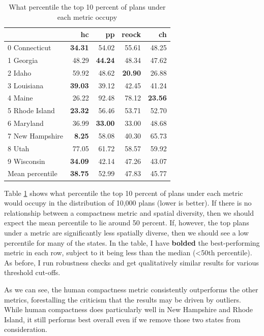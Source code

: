 \documentclass[]{article}
\begin{document}
\begin{table}[h!]
\begin{center}
\caption{What percentile the top 10 percent of plans under each metric occupy}
\label{table:top_plans_sd_percentile}
\begin{tabular}{lrrrr}
\toprule
{} &     hc &     pp &  reock &     ch \\
\midrule
0 Connecticut &  \textbf{34.31} &  54.02 &  55.61 &  48.25 \\
1 Georgia &  48.29 &  \textbf{44.24} &  48.34 &  47.62 \\
2 Idaho &  59.92 &  48.62 &  \textbf{20.90} &  26.88 \\
3 Louisiana &  \textbf{39.03} &  39.12 &  42.45 &  41.24 \\
4 Maine &  26.22 &  92.48 &  78.12 &  \textbf{23.56} \\
5 Rhode Island &  \textbf{23.32} &  56.46 &  53.71 &  52.70 \\
6 Maryland &  36.99 &  \textbf{33.00} &  33.00 &  48.68 \\
7 New Hampshire &   \textbf{8.25} &  58.08 &  40.30 &  65.73 \\
8 Utah &  77.05 &  61.72 &  58.57 &  59.92 \\
9 Wisconsin &  \textbf{34.09} &  42.14 &  47.26 &  43.07 \\
\bottomrule
Mean percentile & \textbf{38.75} &  52.99  &  47.83 &  45.77 \\
\bottomrule
\end{tabular}
\end{center}
\end{table}

Table \ref{table:top_plans_sd_percentile} shows what percentile the top
10 percent of plans under each metric would occupy in the distribution
of 10,000 plans (lower is better). If there is no relationship between a
compactness metric and spatial diversity, then we should expect the mean
percentile to lie around 50 percent. If, however, the top plans under a
metric are significantly less spatially diverse, then we should see a
low percentile for many of the states. In the table, I have
\textbf{bolded} the best-performing metric in each row, subject to it
being less than the median (\textless{}50th percentile). As before, I
run robustness checks and get qualitatively similar results for various
threshold cut-offs.

As we can see, the human compactness metric consistently outperforms the
other metrics, forestalling the criticism that the results may be driven
by outliers. While human compactness does particularly well in New
Hampshire and Rhode Island, it still performs best overall even if we
remove those two states from consideration.
\end{document}
